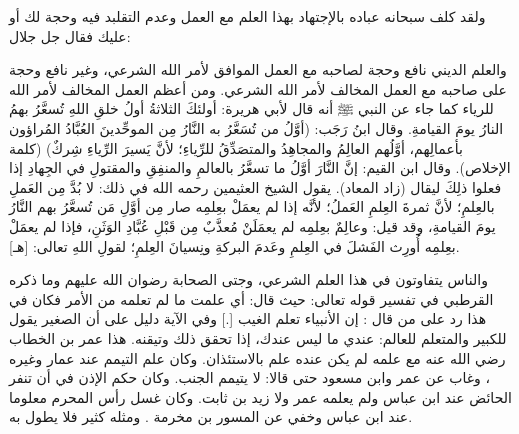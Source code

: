 ولقد كلف سبحانه عباده بالإجتهاد بهذا العلم مع العمل 
\quranayah*[4][135][1-9]{\footnotesize \surahname*[4]}
\quranayah*[5][8][1-9]{\footnotesize \surahname*[5]}
وعدم التقلبد فيه وحجة لك أو عليك فقال جل جلال: 
\quranayah*[33][67]{\footnotesize \surahname*[33]}

والعلم الديني نافع وحجة لصاحبه مع العمل الموافق لأمر الله الشرعي، وغير نافع وحجة على صاحبه مع العمل المخالف لأمر الله الشرعي. ومن أعظم العمل المخالف لأمر الله للرياء كما جاء عن النبي ﷺ أنه قال لأبي هريرة: أولئكَ الثلاثةُ أولُ خلقِ اللهِ تُسعَّرُ بهمُ النارُ يومَ القيامةِ. وقال ابنُ رَجَب: (أوَّلُ من تُسَعَّرُ به النَّارُ مِن الموحِّدينَ العُبَّادُ المُراؤون بأعمالِهم، أوَّلُهم العالِمُ والمجاهِدُ والمتصَدِّقُ للرِّياءِ؛ لأنَّ يَسيرَ الرِّياءِ شِركٌ) {\footnotesize (كلمة الإخلاص)}. وقال ابن القيم: إنَّ النَّارَ أوَّلُ ما تسعَّرُ بالعالمِ والمنفِقِ والمقتولِ في الجِهادِ إذا فعلوا ذلِكَ ليقال {\footnotesize (زاد المعاد)}. يقول الشيخ العثيمين رحمه الله في ذلك: لا بُدَّ مِن العَملِ بالعِلمِ؛ لأنَّ ثمرةَ العِلمِ العَملُ؛ لأنَّه إذا لم يعمَلْ بعِلمِه صار مِن أوَّلِ مَن تُسعَّرُ بهم النَّارُ يومَ القيامةِ، وقد قيل: وعالِمٌ بعِلمِه لم يعمَلَنْ مُعذَّبٌ مِن قَبْلِ عُبَّادِ الوَثَنِ، فإذا لم يعمَلْ بعِلمِه أُورِث الفَشلَ في العِلمِ وعَدمَ البركةِ ونِسيانَ العِلمِ؛ لقولِ اللهِ تعالى:
\quranayah*[5][13]{\footnotesize \surahname*[13]} [هـ].

والناس يتفاوتون في هذا العلم الشرعي، وجتى الصحابة رضوان الله عليهم وما ذكره القرطبي في تفسير قوله تعالى: 
\quranayah*[27][22]{\footnotesize \surahname*[27]}
حيث قال: أي علمت ما لم تعلمه من الأمر فكان في هذا رد على من قال : إن الأنبياء تعلم الغيب [.] وفي الآية دليل على أن الصغير يقول للكبير والمتعلم للعالم: عندي ما ليس عندك، إذا تحقق ذلك وتيقنه. هذا عمر بن الخطاب رضي الله عنه مع علمه لم يكن عنده علم بالاستئذان. وكان علم التيمم عند عمار وغيره ، وغاب عن عمر وابن مسعود حتى قالا: لا يتيمم الجنب. وكان حكم الإذن في أن تنفر الحائض عند ابن عباس ولم يعلمه عمر ولا زيد بن ثابت. وكان غسل رأس المحرم معلوما عند ابن عباس وخفي عن المسور بن مخرمة . ومثله كثير فلا يطول به. 

